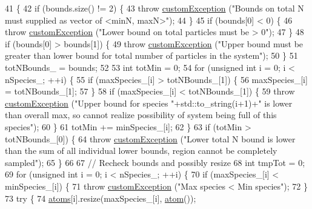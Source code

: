 \begin{DoxyCode}
41                                                               \{
42     \textcolor{keywordflow}{if} (bounds.size() != 2) \{
43         \textcolor{keywordflow}{throw} \hyperlink{classcustom_exception}{customException} (\textcolor{stringliteral}{"Bounds on total N must supplied as vector of <minN, maxN>"});
44     \}
45     \textcolor{keywordflow}{if} (bounds[0] < 0) \{
46         \textcolor{keywordflow}{throw} \hyperlink{classcustom_exception}{customException} (\textcolor{stringliteral}{"Lower bound on total particles must be > 0"});
47     \}
48     \textcolor{keywordflow}{if} (bounds[0] > bounds[1]) \{
49         \textcolor{keywordflow}{throw} \hyperlink{classcustom_exception}{customException} (\textcolor{stringliteral}{"Upper bound must be greater than lower bound for total
       number of particles in the system"});
50     \}
51     totNBounds\_ = bounds;
52 
53     \textcolor{keywordtype}{int} totMin = 0;
54     \textcolor{keywordflow}{for} (\textcolor{keywordtype}{unsigned} \textcolor{keywordtype}{int} i = 0; i < nSpecies\_; ++i) \{
55         \textcolor{keywordflow}{if} (maxSpecies\_[i] > totNBounds\_[1]) \{
56             maxSpecies\_[i] = totNBounds\_[1];
57         \}
58         \textcolor{keywordflow}{if} (maxSpecies\_[i] < totNBounds\_[1]) \{
59             \textcolor{keywordflow}{throw} \hyperlink{classcustom_exception}{customException} (\textcolor{stringliteral}{"Upper bound for species "}+std::to\_string(i+1)+\textcolor{stringliteral}{" is lower
       than overall max, so cannot realize possibility of system being full of this species"});
60         \}
61         totMin += minSpecies\_[i];
62     \}
63     \textcolor{keywordflow}{if} (totMin > totNBounds\_[0]) \{
64         \textcolor{keywordflow}{throw} \hyperlink{classcustom_exception}{customException} (\textcolor{stringliteral}{"Lower total N bound is lower than the sum of all individual
       lower bounds, region cannot be completely sampled"});
65     \}
66 
67     \textcolor{comment}{// Recheck bounds and possibly resize}
68     \textcolor{keywordtype}{int} tmpTot = 0;
69     \textcolor{keywordflow}{for} (\textcolor{keywordtype}{unsigned} \textcolor{keywordtype}{int} i = 0; i < nSpecies\_; ++i) \{
70         \textcolor{keywordflow}{if} (maxSpecies\_[i] < minSpecies\_[i]) \{
71             \textcolor{keywordflow}{throw} \hyperlink{classcustom_exception}{customException} (\textcolor{stringliteral}{"Max species < Min species"});
72         \}
73         \textcolor{keywordflow}{try} \{
74             \hyperlink{classsim_system_a90421b19082f7fb8fc23b7264b1161e4}{atoms}[i].resize(maxSpecies\_[i], \hyperlink{classatom}{atom}());

\end{DoxyCode}
